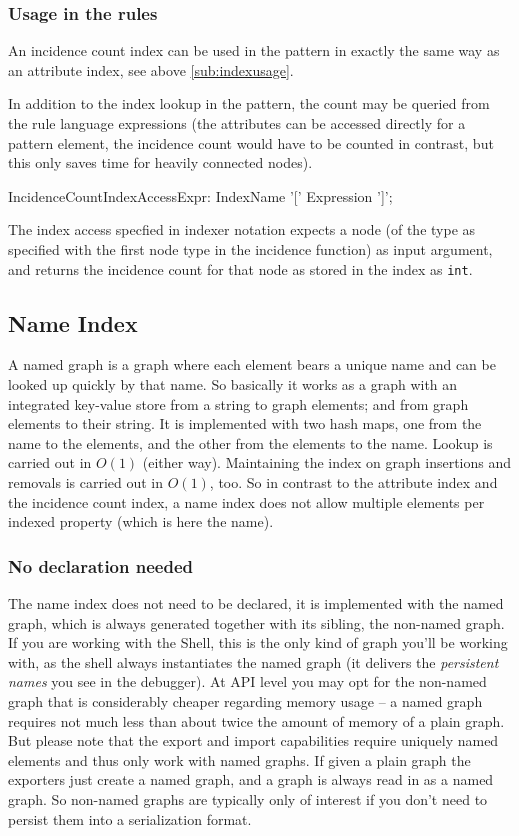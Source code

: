 \subsubsection*{Usage in the rules}
An incidence count index can be used in the pattern in exactly the same way as an attribute index, see above \ref{sub:indexusage}.

In addition to the index lookup in the pattern, 
the count may be queried from the rule language expressions (the attributes can be accessed directly for a pattern element, the incidence count would have to be counted in contrast, but this only saves time for heavily connected nodes).

\begin{rail}
  IncidenceCountIndexAccessExpr:
    IndexName '[' Expression ']';
\end{rail}

The index access specfied in indexer notation expects a node (of the type as specified with the first node type in the incidence function) as input argument, and returns the incidence count for that node as stored in the index as \texttt{int}.

\subsection{Name Index}\label{sec:nameindex}
A named graph is a graph where each element bears a unique name and can be looked up quickly by that name.
So basically it works as a graph with an integrated key-value store from a string to graph elements; and from graph elements to their string.
It is implemented with two hash maps, one from the name to the elements, and the other from the elements to the name.
Lookup is carried out in $O(1)$ (either way).
Maintaining the index on graph insertions and removals is carried out in $O(1)$, too.
So in contrast to the attribute index and the incidence count index, a name index does not allow multiple elements per indexed property (which is here the name).

\subsubsection*{No declaration needed}
The name index does not need to be declared, it is implemented with the named graph, which is always generated together with its sibling, the non-named graph.
If you are working with the Shell, this is the only kind of graph you'll be working with, as the shell always instantiates the named graph (it delivers the \emph{persistent names} you see in the debugger).
At API level you may opt for the non-named graph that is considerably cheaper regarding memory usage -- a named graph requires not much less than about twice the amount of memory of a plain graph.
But please note that the export and import capabilities require uniquely named elements and thus only work with named graphs.
If given a plain graph the exporters just create a named graph, and a graph is always read in as a named graph.
So non-named graphs are typically only of interest if you don't need to persist them into a serialization format.

